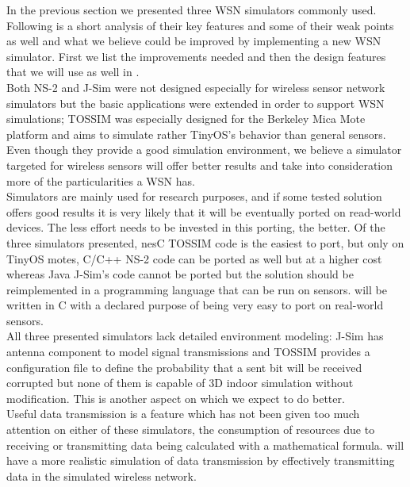 In the previous section we presented three WSN simulators commonly used.
Following is a short analysis of their key features and some of their
weak points as well and what we believe could be improved by implementing a
new WSN simulator. First we list the improvements needed and then the 
design features that we will use as well in \codename. 
\\
    Both NS-2 and J-Sim were not designed especially for wireless 
sensor network simulators but the basic applications were extended
in order to support WSN simulations; TOSSIM was especially designed
for the Berkeley Mica Mote platform and aims to simulate rather TinyOS's behavior
than general sensors. Even though they provide a good simulation environment,
we believe a simulator targeted for wireless sensors will offer better results
and take into consideration more of the particularities a WSN has.
\\
    Simulators are mainly used for research purposes, and if some tested solution
offers good results it is very likely that it will be eventually ported on 
read-world devices. The less effort needs to be invested in this porting, the
better. Of the three simulators presented, nesC TOSSIM code is the easiest to port,
but only on TinyOS motes, C/C++ NS-2 code can be ported as well but at a higher
cost whereas Java J-Sim's code cannot be ported but the solution should be 
reimplemented in a programming language that can be run on sensors.
\codename will be written in C with a declared purpose of being very easy to port
on real-world sensors.
\\
All three presented simulators lack detailed environment modeling: J-Sim has 
antenna component to model signal transmissions and TOSSIM provides a configuration
file to define the probability that a sent bit will be received corrupted but 
none of them is capable of 3D indoor simulation without modification. 
This is another aspect on which we expect \codename to do better. 
\\
Useful data transmission is a feature which has not been given too much 
attention on either of these simulators, the consumption of resources due to
receiving or transmitting data being calculated with a mathematical formula.
 \codename will have a more realistic simulation of data transmission by effectively
transmitting data in the simulated wireless network.
  

